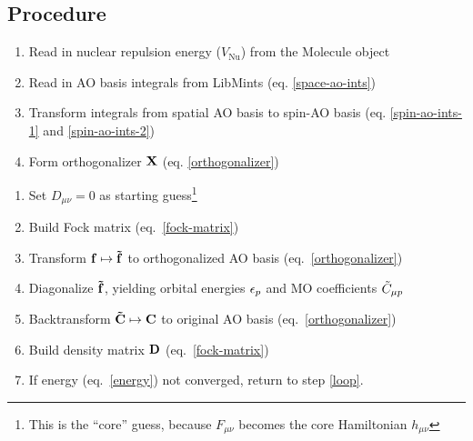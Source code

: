 \documentclass[fleqn]{article}
\begin{document}
\subsection*{Procedure}

\begin{enumerate}
  \item Read in nuclear repulsion energy ($V_\mathrm{Nu}$) from the Molecule object
  \item Read in AO basis integrals from LibMints (eq. \ref{space-ao-ints})
  \item Transform integrals from spatial AO basis to spin-AO basis (eq. \ref{spin-ao-ints-1} and \ref{spin-ao-ints-2})
  \item Form orthogonalizer $\mathbf{X}$ (eq. \ref{orthogonalizer})
\end{enumerate}

\noindent
{}
\begin{enumerate}
  \item Set $D_{\mu\nu}=0$ as starting guess\footnote{This is the ``core'' guess, because $F_{\mu\nu}$ becomes the core Hamiltonian $h_{\mu\nu}$}
  \item\label{loop} Build Fock matrix (eq.~\ref{fock-matrix})
  \item Transform $\mathbf{f}\mapsto\mathbf{\tilde{f}}$ to orthogonalized AO basis (eq.~\ref{orthogonalizer})
  \item Diagonalize $\mathbf{\tilde{f}}$, yielding orbital energies $\epsilon_p$ and MO coefficients $\tilde{C}_{\mu p}$
  \item Backtransform $\mathbf{\tilde{C}}\mapsto\mathbf{C}$ to original AO basis (eq.~\ref{orthogonalizer})
  \item Build density matrix $\mathbf{D}$ (eq.~\ref{fock-matrix})
  \item If energy (eq.~\ref{energy}) not converged, return to step \ref{loop}.
\end{enumerate}
\end{document}
